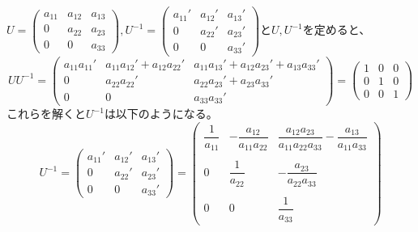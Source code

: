 \documentclass[titlepage]{jsarticle}
\begin{document}
		$\displaystyle
	            U = \left(
	                \begin{array}{ccc}
	                    a_{11} & a_{12} & a_{13} \\
	                    0 & a_{22} & a_{23} \\
	                    0 & 0 & a_{33}
	                \end{array}
	            \right), 
	            U^{-1} = \left(
	                \begin{array}{ccc}
	                    a_{11}' & a_{12}' & a_{13}' \\
	                    0 & a_{22}' & a_{23}' \\
	                    0 & 0 & a_{33}'
	                \end{array}
	            \right)
		$と$U,U^{-1}$を定めると、
		\begin{equation}
	            	UU^{-1} = \left(
	                \begin{array}{ccc}
	                    a_{11}a_{11}' & a_{11}a_{12}'+a_{12}a_{22}' & a_{11}a_{13}'+a_{12}a_{23}'+a_{13}a_{33}' \\
	                    0 & a_{22}a_{22}' & a_{22}a_{23}'+a_{23}a_{33}' \\
	                    0 & 0 & a_{33}a_{33}'
	                \end{array}
	            \right)=
			\left(
	                \begin{array}{ccc}
	                    1 & 0 & 0 \\
	                    0 & 1 & 0 \\
	                    0 & 0 & 1
	                \end{array}	
	            \right)\nonumber
		\end{equation}
		これらを解くと$U^{-1}$は以下のようになる。
		\begin{equation}
	            	U^{-1} = \left(
	                \begin{array}{ccc}
	                    a_{11}' & a_{12}' & a_{13}' \\
	                    0 & a_{22}' & a_{23}' \\
	                    0 & 0 & a_{33}'
	                \end{array}
	            \right)=
			\left(
	                \begin{array}{ccc}
	                    \dfrac{1}{a_{11}} & -\dfrac{a_{12}}{a_{11}a_{22}} & \dfrac{a_{12}a_{23}}{a_{11}a_{22}a_{33}}
				 -\dfrac{a_{13}}{a_{11}a_{33}} \\
					& & \\
	                    0 & \dfrac{1}{a_{22}} & -\dfrac{a_{23}}{a_{22}a_{33}} \\
					& & \\
	                    0 & 0 & \dfrac{1}{a_{33}}
	                \end{array}
	            \right)\nonumber
		\end{equation}
\end{document}
